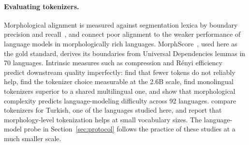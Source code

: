 \paragraph{Evaluating tokenizers.}
Morphological alignment is measured against segmentation lexica by boundary precision and recall~\cite{batsuren2024evaluating,arnett2025morphscore}, and \citet{arnett2025why} connect poor alignment to the weaker performance of language models in morphologically rich languages.
MorphScore~\cite{arnett2025morphscore}, used here as the gold standard, derives its boundaries from Universal Dependencies lemmas in 70 languages.
Intrinsic measures such as compression and R\'enyi efficiency~\cite{zouhar2023noiseless} predict downstream quality imperfectly: \citet{schmidt2024tokenization} find that fewer tokens do not reliably help, \citet{ali2024tokenizer} find the tokenizer choice measurable at the 2.6B scale, \citet{rust2021tokenizer} find monolingual tokenizers superior to a shared multilingual one, and \citet{park2021morphology} show that morphological complexity predicts language-modeling difficulty across 92 languages.
\citet{toraman2023tokenization} compare tokenizers for Turkish, one of the languages studied here, and report that morphology-level tokenization helps at small vocabulary sizes.
The language-model probe in Section~\ref{sec:protocol} follows the practice of these studies at a much smaller scale.
